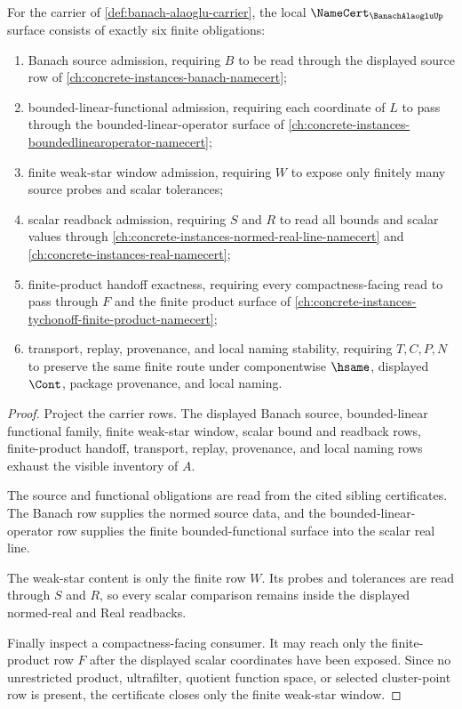 \begin{theorem}
\label{thm:banach-alaoglu-namecert-obligations}
For the carrier of \autoref{def:banach-alaoglu-carrier}, the local $\NameCert_{\BanachAlaogluUp}$ surface consists of exactly six finite obligations:
\begin{enumerate}
\item Banach source admission, requiring $B$ to be read through the displayed source row of \autoref{ch:concrete-instances-banach-namecert};
\item bounded-linear-functional admission, requiring each coordinate of $L$ to pass through the bounded-linear-operator surface of \autoref{ch:concrete-instances-boundedlinearoperator-namecert};
\item finite weak-star window admission, requiring $W$ to expose only finitely many source probes and scalar tolerances;
\item scalar readback admission, requiring $S$ and $R$ to read all bounds and scalar values through \autoref{ch:concrete-instances-normed-real-line-namecert} and \autoref{ch:concrete-instances-real-namecert};
\item finite-product handoff exactness, requiring every compactness-facing read to pass through $F$ and the finite product surface of \autoref{ch:concrete-instances-tychonoff-finite-product-namecert};
\item transport, replay, provenance, and local naming stability, requiring $T,C,P,N$ to preserve the same finite route under componentwise $\hsame$, displayed $\Cont$, package provenance, and local naming.
\end{enumerate}
\end{theorem}
\begin{proof}
Project the carrier rows. The displayed Banach source, bounded-linear functional family, finite weak-star window, scalar bound and readback rows, finite-product handoff, transport, replay, provenance, and local naming rows exhaust the visible inventory of $A$.

The source and functional obligations are read from the cited sibling certificates. The Banach row supplies the normed source data, and the bounded-linear-operator row supplies the finite bounded-functional surface into the scalar real line.

The weak-star content is only the finite row $W$. Its probes and tolerances are read through $S$ and $R$, so every scalar comparison remains inside the displayed normed-real and Real readbacks.

Finally inspect a compactness-facing consumer. It may reach only the finite-product row $F$ after the displayed scalar coordinates have been exposed. Since no unrestricted product, ultrafilter, quotient function space, or selected cluster-point row is present, the certificate closes only the finite weak-star window.
\end{proof}

